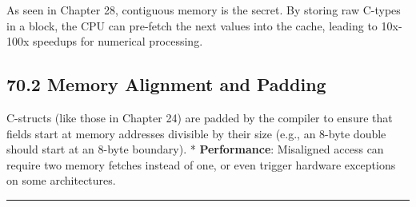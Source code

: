 As seen in Chapter 28, contiguous memory is the secret. By storing raw
C-types in a block, the CPU can pre-fetch the next values into the
cache, leading to 10x-100x speedups for numerical processing.

\hypertarget{memory-alignment-and-padding}{%
\subsection{70.2 Memory Alignment and
Padding}\label{memory-alignment-and-padding}}

C-structs (like those in Chapter 24) are padded by the compiler to
ensure that fields start at memory addresses divisible by their size
(e.g., an 8-byte double should start at an 8-byte boundary). *
\textbf{Performance}: Misaligned access can require two memory fetches
instead of one, or even trigger hardware exceptions on some
architectures.

\begin{center}\rule{0.5\linewidth}{0.5pt}\end{center}

